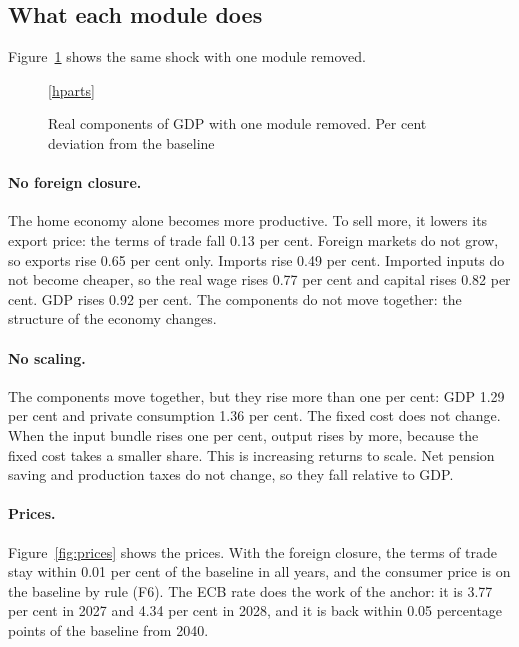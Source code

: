 \documentclass[11pt,a4paper]{article}
\newcommand{\components}[1]{%
  \addplot[one, domain=2026:2075, samples=2] {1};
  \addplot[black, line width=1.4pt] table[x=year, y=gdp#1]{\hmacro};
  \addplot[fcblue, line width=1.0pt] table[x=year, y=con#1]{\hmacro};
  \addplot[fcorange, line width=1.0pt] table[x=year, y=inv#1]{\hmacro};
  \addplot[fcgreen, line width=1.0pt] table[x=year, y=gov#1]{\hmacro};
  \addplot[fcpurple, line width=1.0pt] table[x=year, y=exp#1]{\hmacro};
  \addplot[fcred, line width=1.0pt, densely dashed] table[x=year, y=imp#1]{\hmacro};
}
\newcommand{\componentlegend}{%
  \legend{GDP, Private consumption, Investment, Government consumption, Exports, Imports}
}
\begin{document}
\subsection{What each module does}
\label{sec:parts}

Figure~\ref{fig:parts} shows the same shock with one module removed.

\begin{figure}[H]
\centering
{}

\ref{hparts}
\caption{Real components of GDP with one module removed. Per cent deviation from the baseline}
\label{fig:parts}
\end{figure}

\paragraph{No foreign closure.}
The home economy alone becomes more productive. To sell more, it lowers its export price: the terms of trade fall 0.13 per cent.
Foreign markets do not grow, so exports rise 0.65 per cent only. Imports rise 0.49 per cent.
Imported inputs do not become cheaper, so the real wage rises 0.77 per cent and capital rises 0.82 per cent.
GDP rises 0.92 per cent. The components do not move together: the structure of the economy changes.

\paragraph{No scaling.}
The components move together, but they rise more than one per cent: GDP 1.29 per cent and private consumption 1.36 per cent.
The fixed cost does not change. When the input bundle rises one per cent, output rises by more, because the fixed cost takes a smaller share. This is increasing returns to scale.
Net pension saving and production taxes do not change, so they fall relative to GDP.

\paragraph{Prices.}
Figure~\ref{fig:prices} shows the prices. With the foreign closure, the terms of trade stay within 0.01 per cent of the baseline in all years, and the consumer price is on the baseline by rule (F6).
The ECB rate does the work of the anchor: it is 3.77 per cent in 2027 and 4.34 per cent in 2028, and it is back within 0.05 percentage points of the baseline from 2040.
\end{document}
